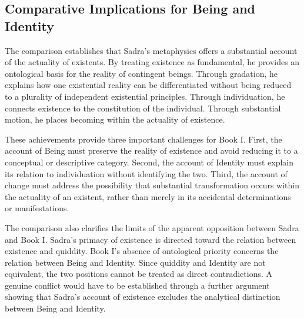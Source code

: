 


\subsection{Comparative Implications for Being and Identity}
\label{subsec:ch08_s17_ss18}

\label{para:VS.B01.P01.C08.S17.SS18.P001}

The comparison establishes
that Sadra's metaphysics
offers a substantial
account of the actuality
of existents. By treating
existence as fundamental,
he provides an ontological
basis for the reality
of contingent beings.
Through gradation, he
explains how one existential
reality can be differentiated
without being reduced
to a plurality of
independent existential
principles. Through
individuation, he
connects existence
to the constitution
of the individual.
Through substantial
motion, he places
becoming within the
actuality of existence.

\label{para:VS.B01.P01.C08.S17.SS18.P002}

These achievements provide
three important challenges
for Book I. First,
the account of Being
must preserve the
reality of existence
and avoid reducing
it to a conceptual
or descriptive category.
Second, the account
of Identity must
explain its relation
to individuation
without identifying
the two. Third,
the account of
change must address
the possibility
that substantial
transformation occurs
within the actuality
of an existent,
rather than merely
in its accidental
determinations or
manifestations.

\label{para:VS.B01.P01.C08.S17.SS18.P003}

The comparison also
clarifies the limits
of the apparent opposition
between Sadra and
Book I. Sadra's
primacy of existence
is directed toward
the relation between
existence and quiddity.
Book I's absence
of ontological priority
concerns the relation
between Being and
Identity. Since quiddity
and Identity are
not equivalent, the
two positions cannot
be treated as direct
contradictions. A
genuine conflict
would have to be
established through
a further argument
showing that Sadra's
account of existence
excludes the analytical
distinction between
Being and Identity.

